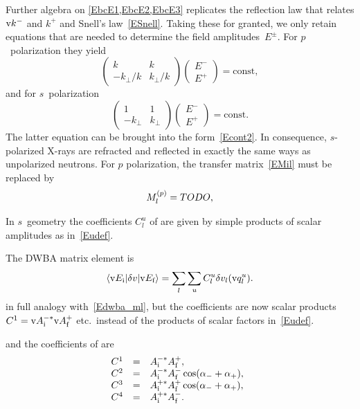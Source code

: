 Further algebra on \cref{EbcE1,EbcE2,EbcE3} replicates the
reflection law that relates $\text{v}{k}^-$ and $k^+$
and Snell's law~\cref{ESnell}.
Taking these for granted,
we only retain equations that are needed to determine the field amplitudes~$E^\pm$.
For $p$~polarization they yield
\begin{equation}
  \left(\begin{array}{cc}k&k\\
       -k_\perp/k&k_\perp/k\end{array}\right)
  \left(\begin{array}{c}E^-\\
       E^+\end{array}\right) = \text{const},
\end{equation}
and for $s$~polarization
\begin{equation}
  \left(\begin{array}{cc}1&1\\
       -k_\perp&k_\perp\end{array}\right)
  \left(\begin{array}{c}E^-\\
       E^+\end{array}\right) = \text{const}.
\end{equation}
The latter equation can be brought into the form~\cref{Econt2}.
In consequence,
$s$-polarized X-rays are refracted and reflected in
exactly the same ways as unpolarized neutrons.
For $p$ polarization, the transfer matrix~\cref{EMil}
must be replaced by
\begin{equation}
  M_l^{\text(p)} = TODO,
\end{equation}

In $s$~geometry the coefficients $C^u_l$ of 
are given by simple products of scalar amplitudes as in~\cref{Eudef}.

The DWBA matrix element is
\begin{equation}\label{Edwba_mlE}
  \left\langle \text{v}{E}_{\text{i}}|\delta v|\text{v}{E}_{\text{f}}\right\rangle
  = \sum_l \sum_{u} C^u_l \delta v_l(\text{v}{q}_l^u).
\end{equation}
in full analogy with~\cref{Edwba_ml},
but the coefficients are now scalar products
$C^1=\text{v}{A}^{-*}_{\text{i}}\text{v}{A}^{+}_{\text{f}}$ etc.\ instead of the products of scalar factors in~\cref{Eudef}.

and the coefficients of  are
\begin{equation}
  \begin{array}{@{}lcl}
    C^1 &=& A^{-*}_\si A^+_\sf,\\
    C^2 &=& A^{-*}_\si A^-_\sf\cos(\alpha_-+\alpha_+),\\
    C^3 &=& A^{+*}_\si A^+_\sf\cos(\alpha_-+\alpha_+),\\
    C^4 &=& A^{+*}_\si A^-_\sf.
  \end{array}
\end{equation}



